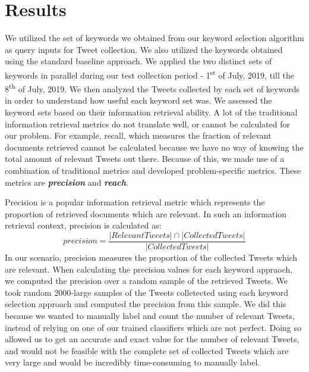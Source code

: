 \documentclass[runningheads]{llncs}
\begin{document}
\section{Results}
We utilized the set of keywords we obtained from our keyword selection algorithm as query inputs for Tweet collection. We also utilized the keywords obtained using the standard baseline approach. We applied the two distinct sets of keywords in parallel during our test collection period -  1\textsuperscript{st} of July, 2019, till the 8\textsuperscript{th} of July, 2019. We then analyzed the Tweets collected by each set of keywords in order to understand how useful each keyword set was. We assessed the keyword sets based on their information retrieval ability. A lot of the traditional information retrieval metrics do not translate well, or cannot be calculated for our problem. For example, recall, which measures the fraction of relevant documents retrieved cannot be calculated because we have no way of knowing the total amount of relevant Tweets out there. Because of this, we made use of a combination of traditional metrics and developed problem-specific metrics. These metrics are \textit{\textbf{precision}} and \textit{\textbf{reach}}.  

Precision is a popular information retrieval metric which represents the proportion of retrieved documents which are relevant. In such an information retrieval context, precision is calculated as:
\begin{equation}
	precision = \frac{|Relevant Tweets| \cap |Collected Tweets|}{|Collected Tweets|}
\end{equation}
In our scenario, precision measures the proportion of the collected Tweets which are relevant. When calculating the precision values for each keyword appraoch, we computed the precision over a random sample of the retrieved Tweets. We took random 2000-large samples of the Tweets colletected using each keyword selection approach and computed the precision from this sample. We did this because we wanted to manually label and count the number of relevant Tweets, instead of relying on one of our trained classifiers which are not perfect. Doing so allowed us to get an accurate and exact value for the number of relevant Tweets, and would not be feasible with the complete set of collected Tweets which are very large and would be incredibly time-consuming to manually label.
\end{document}
